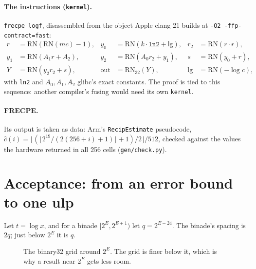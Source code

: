 \documentclass[11pt]{article}
\newcommand{\lean}[1]{{\small\texttt{#1}}}
\newcommand{\RN}{\mathrm{RN}}
\begin{document}
\paragraph{The instructions (\lean{kernel}).} \texttt{frecpe\_logf}, disassembled from
the object Apple clang 21 builds at \texttt{-O2 -ffp-contract=fast}:
\begin{align*}
r &= \RN(\RN(m c) - 1), &
y_0 &= \RN(k \cdot \mathtt{ln2} + \mathrm{lg}), &
r_2 &= \RN(r \cdot r), \\
y_1 &= \RN(A_1 r + A_2), &
y_2 &= \RN(A_0 r_2 + y_1), &
s &= \RN(y_0 + r), \\
Y &= \RN(y_2 r_2 + s), &
\mathrm{out} &= \RN_{32}(Y), &
\mathrm{lg} &= \RN(-\log c),
\end{align*}
with \texttt{ln2} and $A_0, A_1, A_2$ glibc's exact constants. The proof is tied to
this sequence: another compiler's fusing would need its own \lean{kernel}.

\paragraph{FRECPE.} Its output is taken as data: Arm's \texttt{RecipEstimate}
pseudocode, $\hat c(i) = \lfloor(\lfloor 2^{19}/(2(256+i)+1)\rfloor + 1)/2\rfloor / 512$,
checked against the values the hardware returned in all 256 cells
(\lean{gen/check.py}).

\section{Acceptance: from an error bound to one ulp}\label{sec:accept}

Let $t = \log x$, and for a binade $[2^E, 2^{E+1})$ let $q = 2^{E-24}$. The binade's
spacing is $2q$; just below $2^E$ it is $q$.

\begin{figure}[h]
\centering
{}
\caption{The binary32 grid around $2^E$. The grid is finer below it, which is why a
result near $2^E$ gets less room.}
\end{figure}
\end{document}

